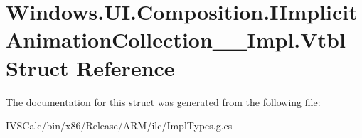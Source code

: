 \hypertarget{struct_windows_1_1_u_i_1_1_composition_1_1_i_implicit_animation_collection_____impl_1_1_vtbl}{}\section{Windows.\+U\+I.\+Composition.\+I\+Implicit\+Animation\+Collection\+\_\+\+\_\+\+Impl.\+Vtbl Struct Reference}
\label{struct_windows_1_1_u_i_1_1_composition_1_1_i_implicit_animation_collection_____impl_1_1_vtbl}


The documentation for this struct was generated from the following file\+:\begin{DoxyCompactItemize}
\item 
I\+V\+S\+Calc/bin/x86/\+Release/\+A\+R\+M/ilc/Impl\+Types.\+g.\+cs\end{DoxyCompactItemize}
